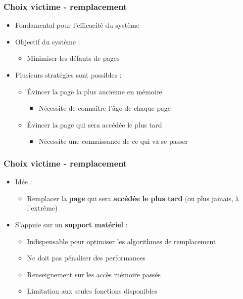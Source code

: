 \begin{frame}
\frametitle{Choix victime - remplacement}
\begin{itemize}
\item Fondamental pour l'efficacité du système
\item Objectif du système :
\begin{itemize}
\item Minimiser les défauts de pages
\end{itemize}
\item Plusieurs stratégies sont possibles :
\begin{itemize}
\item Évincer la page la plus ancienne en mémoire
\begin{itemize}
\item Nécessite de connaître l'âge de chaque page
\end{itemize}
\item Évincer la page qui sera accédée le plus tard
\begin{itemize}
\item Nécessite une connaissance de ce qui va se passer
\end{itemize}
\end{itemize}
\end{itemize}
\end{frame}


\begin{frame}
\frametitle{Choix victime - remplacement}
\begin{itemize}
\item Idée :
\begin{itemize}
\item Remplacer la \textbf{page} qui sera \textbf{accédée le plus tard} (ou plus jamais, à l'extrême)
\end{itemize}
\item S'appuie sur un \textbf{support matériel} :
\begin{itemize}
\item Indispensable pour optimiser les algorithmes de remplacement
\item Ne doit pas pénaliser des performances
\item Renseignement sur les accès mémoire passés
\item Limitation aux seules fonctions disponibles
\end{itemize}
\end{itemize}
\end{frame}


